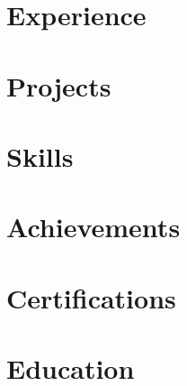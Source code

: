 \documentclass[letter,10pt]{article}
\begin{document}
\thispagestyle{fancy}



\section{Experience}


\section{Projects}


\section{Skills}


\section{Achievements}


\section{Certifications}


\section{Education}


% 

% 
\end{document}
